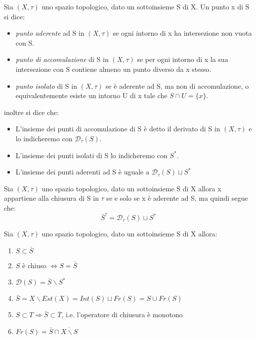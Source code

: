 \documentclass[a4paper]{article}
\begin{document}
\begin{deff}
Sia $(X, \tau )$ uno spazio topologico, dato un sottoinsieme S di X. Un punto x di S si dice:
\begin{itemize}
	\item \emph{punto aderente} ad S in $(X, \tau )$ se ogni intorno di x ha intersezione non vuota con S.
	\item \emph{punto di accomulazione} di S in $(X, \tau )$ se per ogni intorno di x la sua intersezione con S contiene almeno un punto diverso da x stesso.
	\item \emph{punto isolato} di S in $(X, \tau )$ se è aderente ad S, ma non di accomulazione, o equivalentemente esiste un intorno U di x tale che $S \cap U = \{ x \} $.
\end{itemize}
inoltre si dice che:
\begin{itemize}
	\item L'insieme dei punti di accomulazione di S è detto il derivato di S in $(X, \tau )$ e lo indicheremo con $\mathcal{D}_{\tau } (S)$.
	\item L'insieme dei punti isolati di S lo indicheremo con $S^* $.
	\item L'insieme dei punti aderenti ad S è uguale a $ \mathcal{D}_{\tau } (S) \sqcup S^* $
\end{itemize}
\end{deff}	 

\begin{prop}
Sia $(X, \tau )$ uno spazio topologico, dato un sottoinsieme S di X allora x appartiene alla chiusura di S in $\tau $ se e solo se x è aderente ad S, ma quindi segue che: 
\begin{equation*}
\bar{S} ^{\tau} =   \mathcal{D}_{\tau } (S) \sqcup S^* 
\end{equation*}
\end{prop}

\begin{form}
Sia $(X, \tau )$ uno spazio topologico, dato un sottoinsieme S di X allora: 
\begin{enumerate}
	\item $ S \subset \bar{S} $
	\item $S$  è chiuso $\Leftrightarrow S = \bar{S} $
	\item $\mathcal{D} (S) = \bar{S} \backslash S^* $
	\item $\bar{S} = X \backslash Est(X) = Int(S) \sqcup Fr(S) = S \cup Fr(S) $
	\item $S \subset T \Rightarrow \bar{S} \subset \overline{T} $, i.e. l'operatore di chiusura è monotono
	\item$Fr(S) = \bar{S} \cap \overline{X \backslash S} $
\end{enumerate}
\end{form}
\end{document}
